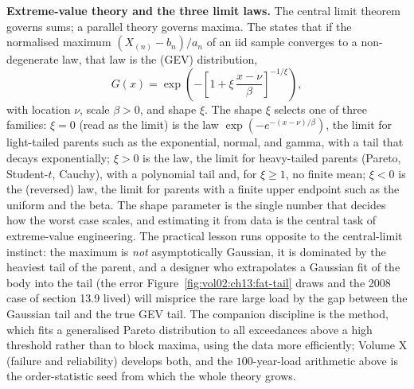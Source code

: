 \begin{mastery}
\textbf{Extreme-value theory and the three limit laws.} The central
limit theorem governs sums; a parallel theory governs maxima. The
 states that if the normalised
maximum $(X_{(n)} - b_{n})/a_{n}$ of an iid sample converges to a
non-degenerate law, that law is the 
(GEV) distribution,
\[
G(x) = \exp\!\left( -\left[1 + \xi\,\frac{x - \nu}{\beta}\right]
^{-1/\xi} \right),
\]
with location $\nu$, scale $\beta > 0$, and shape $\xi$. The shape
$\xi$ selects one of three families: $\xi = 0$ (read as the limit) is
the  law $\exp(-e^{-(x-\nu)/\beta})$, the limit for
light-tailed parents such as the exponential, normal, and gamma, with a
tail that decays exponentially; $\xi > 0$ is the 
law, the limit for heavy-tailed parents (Pareto, Student-$t$, Cauchy),
with a polynomial tail and, for $\xi \geq 1$, no finite mean; $\xi < 0$
is the  (reversed) law, the limit for parents with a
finite upper endpoint such as the uniform and the beta. The shape
parameter is the single number that decides how the worst case scales,
and estimating it from data is the central task of extreme-value
engineering. The practical lesson runs opposite to the central-limit
instinct: the maximum is \emph{not} asymptotically Gaussian, it is
dominated by the heaviest tail of the parent, and a designer who
extrapolates a Gaussian fit of the body into the tail (the error
Figure~\ref{fig:vol02:ch13:fat-tail} draws and the 2008 case of section
13.9 lived) will misprice the rare large load by the gap between the
Gaussian tail and the true GEV tail. The companion discipline is the
 method, which fits a generalised Pareto
distribution to all exceedances above a high threshold rather than to
block maxima, using the data more efficiently; Volume X (failure and
reliability) develops both, and the $100$-year-load arithmetic above is
the order-statistic seed from which the whole theory grows.
\end{mastery}

